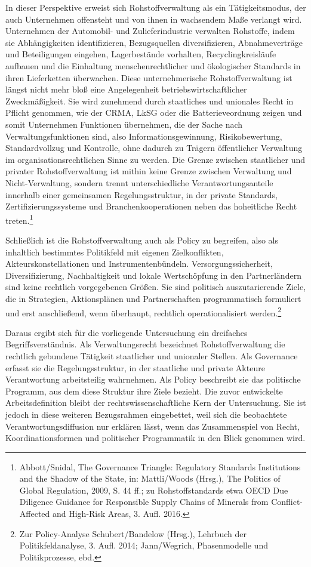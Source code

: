 \documentclass[12pt,a4paper,oneside]{book} %
\begin{document}
{	In dieser Perspektive erweist sich Rohstoffverwaltung als ein Tätigkeitsmodus, der auch Unternehmen offensteht und von ihnen in wachsendem Maße verlangt wird. Unternehmen der Automobil- und Zulieferindustrie verwalten Rohstoffe, indem sie Abhängigkeiten identifizieren, Bezugsquellen diversifizieren, Abnahmeverträge und Beteiligungen eingehen, Lagerbestände vorhalten, Recyclingkreisläufe aufbauen und die Einhaltung menschenrechtlicher und ökologischer Standards in ihren Lieferketten überwachen. Diese unternehmerische Rohstoffverwaltung ist längst nicht mehr bloß eine Angelegenheit betriebswirtschaftlicher Zweckmäßigkeit. Sie wird zunehmend durch staatliches und unionales Recht in Pflicht genommen, wie der CRMA, LkSG oder die Batterieveordnung zeigen und somit Unternehmen Funktionen übernehmen, die der Sache nach Verwaltungsfunktionen sind, also Informationsgewinnung, Risikobewertung, Standardvollzug und Kontrolle, ohne dadurch zu Trägern öffentlicher Verwaltung im organisationsrechtlichen Sinne zu werden. Die Grenze zwischen staatlicher und privater Rohstoffverwaltung ist mithin keine Grenze zwischen Verwaltung und Nicht-Verwaltung, sondern trennt unterschiedliche Verantwortungsanteile innerhalb einer gemeinsamen Regelungsstruktur, in der private Standards, Zertifizierungssysteme und Branchenkooperationen neben das hoheitliche Recht treten.\footnote{Abbott/Snidal, The Governance Triangle: Regulatory Standards Institutions and the Shadow of the State, in: Mattli/Woods (Hrsg.), The Politics of Global Regulation, 2009, S. 44 ff.; zu Rohstoffstandards etwa OECD Due Diligence Guidance for Responsible Supply Chains of Minerals from Conflict-Affected and High-Risk Areas, 3. Aufl. 2016.}
	
	Schließlich ist die Rohstoffverwaltung auch als Policy zu begreifen, also als inhaltlich bestimmtes Politikfeld mit eigenen Zielkonflikten, Akteurskonstellationen und Instrumentenbündeln. Versorgungssicherheit, Diversifizierung, Nachhaltigkeit und lokale Wertschöpfung in den Partnerländern sind keine rechtlich vorgegebenen Größen. Sie sind politisch auszutarierende Ziele, die in Strategien, Aktionsplänen und Partnerschaften programmatisch formuliert und erst anschließend, wenn überhaupt, rechtlich operationalisiert werden.\footnote{Zur Policy-Analyse Schubert/Bandelow (Hrsg.), Lehrbuch der Politikfeldanalyse, 3. Aufl. 2014; Jann/Wegrich, Phasenmodelle und Politikprozesse, ebd.}
	
	Daraus ergibt sich für die vorliegende Untersuchung ein dreifaches Begriffsverständnis. Als Verwaltungsrecht bezeichnet Rohstoffverwaltung die rechtlich gebundene Tätigkeit staatlicher und unionaler Stellen. Als Governance erfasst sie die Regelungsstruktur, in der staatliche und private Akteure Verantwortung arbeitsteilig wahrnehmen. Als Policy beschreibt sie das politische Programm, aus dem diese Struktur ihre Ziele bezieht. Die zuvor entwickelte Arbeitsdefinition bleibt der rechtswissenschaftliche Kern der Untersuchung. Sie ist jedoch in diese weiteren Bezugsrahmen eingebettet, weil sich die beobachtete Verantwortungsdiffusion nur erklären lässt, wenn das Zusammenspiel von Recht, Koordinationsformen und politischer Programmatik in den Blick genommen wird.
	
}
\end{document}
